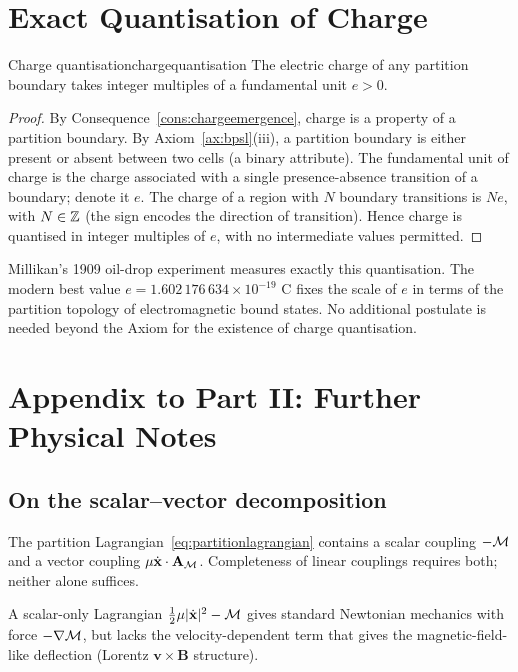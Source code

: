 \section{Exact Quantisation of Charge}
\label{sec:chargequant}

\begin{consequence}{Charge quantisation}{chargequantisation}
The electric charge of any partition boundary takes integer multiples of a fundamental unit $e>0$.
\end{consequence}

\begin{proof}
By Consequence~\ref{cons:chargeemergence}, charge is a property of a partition boundary. By Axiom~\ref{ax:bpsl}(iii), a partition boundary is either present or absent between two cells (a binary attribute). The fundamental unit of charge is the charge associated with a single presence-absence transition of a boundary; denote it $e$. The charge of a region with $N$ boundary transitions is $Ne$, with $N\in\mathbb{Z}$ (the sign encodes the direction of transition). Hence charge is quantised in integer multiples of $e$, with no intermediate values permitted.
\end{proof}

\begin{remark}
Millikan's 1909 oil-drop experiment \citep{millikan1913} measures exactly this quantisation. The modern best value $e=1.602\,176\,634\times 10^{-19}$ C \citep{codata2018} fixes the scale of $e$ in terms of the partition topology of electromagnetic bound states. No additional postulate is needed beyond the Axiom for the existence of charge quantisation.
\end{remark}

\section*{Appendix to Part II: Further Physical Notes}

\subsection{On the scalar--vector decomposition}

The partition Lagrangian~\eqref{eq:partitionlagrangian} contains a scalar coupling $-\mathcal{M}$ and a vector coupling $\mu\dot{\mathbf{x}}\cdot\mathbf{A}_{\mathcal{M}}$. Completeness of linear couplings requires both; neither alone suffices.

A scalar-only Lagrangian $\tfrac{1}{2}\mu|\dot{\mathbf{x}}|^{2}-\mathcal{M}$ gives standard Newtonian mechanics with force $-\nabla\mathcal{M}$, but lacks the velocity-dependent term that gives the magnetic-field-like deflection (Lorentz $\mathbf{v}\times\mathbf{B}$ structure).


